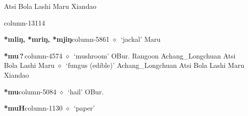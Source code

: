 \hspace{1ex}
         Atsi 
\hspace{1ex}
         Bola 
\hspace{1ex}
         Lashi 
\hspace{1ex}
         Maru 
\hspace{1ex}
         Xiandao 
  \item {\footnotesize \textbf{}}{\tiny column-13114}
  \item {\footnotesize \textbf{*mliŋ, *mriŋ, *mjiŋ}}{\tiny column-5861}
         $\diamond$~`jackal'
         Maru 
  \item {\footnotesize \textbf{*mu\,?\,}}{\tiny column-4574}
         $\diamond$~`mushroom'
         OBur. 
\hspace{1ex}
         Rangoon 
\hspace{1ex}
         Achang\_Longchuan 
\hspace{1ex}
         Atsi 
\hspace{1ex}
         Bola 
\hspace{1ex}
         Lashi 
\hspace{1ex}
         Maru 
\hspace{1ex}
         $\diamond$~`fungus (edible)'
         Achang\_Longchuan 
\hspace{1ex}
         Atsi 
\hspace{1ex}
         Bola 
\hspace{1ex}
         Lashi 
\hspace{1ex}
         Maru 
\hspace{1ex}
         Xiandao 
  \item {\footnotesize \textbf{*mu}}{\tiny column-5084}
         $\diamond$~`hail'
         OBur. 
  \item {\footnotesize \textbf{*muH}}{\tiny column-1130}
         $\diamond$~`paper'
